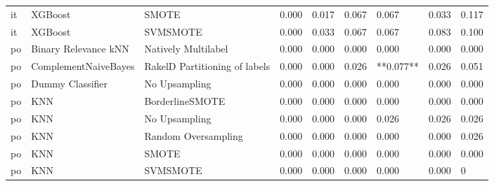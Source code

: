 \begin{tabular}{lllllllll}
      it &                         XGBoost &                         SMOTE &     0.000 &                     0.017 &                 0.067 &                  0.067 &                                   0.033 &     0.117 \\
      it &                         XGBoost &                      SVMSMOTE &     0.000 &                     0.033 &                 0.067 &                  0.067 &                                   0.083 &     0.100 \\
      po &            Binary Relevance kNN &           Natively Multilabel &     0.000 &                     0.000 &                 0.000 &                  0.000 &                                   0.000 &     0.000 \\
      po &            ComplementNaiveBayes & RakelD Partitioning of labels &     0.000 &                     0.000 &                 0.026 &              **0.077** &                                   0.026 &     0.051 \\
      po &                Dummy Classifier &                 No Upsampling &     0.000 &                     0.000 &                 0.000 &                  0.000 &                                   0.000 &     0.000 \\
      po &                             KNN &               BorderlineSMOTE &     0.000 &                     0.000 &                 0.000 &                  0.000 &                                   0.000 &     0.000 \\
      po &                             KNN &                 No Upsampling &     0.000 &                     0.000 &                 0.000 &                  0.026 &                                   0.026 &     0.026 \\
      po &                             KNN &           Random Oversampling &     0.000 &                     0.000 &                 0.000 &                  0.000 &                                   0.000 &     0.026 \\
      po &                             KNN &                         SMOTE &     0.000 &                     0.000 &                 0.000 &                  0.000 &                                   0.000 &     0.000 \\
      po &                             KNN &                      SVMSMOTE &     0.000 &                     0.000 &                 0.000 &                  0.000 &                                   0.000 &         0 \\

\end{tabular}
